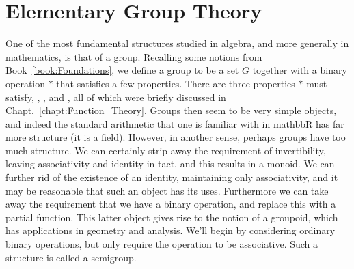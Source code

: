 \begingroup
    \ifcsname\PATH\endcsname
        \newcommand{\PATH}{books/Algebra/Group_Theory}
        \newcommand{\OLDPATH}{\PATH}
    \else
        \newcommand{\OLDPATH}{\PATH}
        \renewcommand{\PATH}{books/Algebra/Group_Theory}
    \fi
    \chapter{Elementary Group Theory}
        One of the most fundamental structures studied in algebra, and more
        generally in mathematics, is that of a \gls{group}.
        Recalling some notions from Book~\ref{book:Foundations}, we define a
        group to be a \gls{set} $G$ together with a
        \gls{binary operation} $*$ that satisfies a few
        properties. There are three properties $*$ must satisfy,
        ,
        , and
        ,
        all of which were briefly discussed in
        Chapt.~\ref{chapt:Function_Theory}. Groups then seem to be very simple
        objects, and indeed the standard arithmetic that one is
        familiar with in \gls{mathbbR} has far more structure (it is a
        \gls{field}). However, in another sense, perhaps groups
        have too much structure. We can certainly strip away the requirement of
        invertibility, leaving associativity and identity in tact, and this
        results in a \gls{monoid}. We can further rid of the
        existence of an identity, maintaining only associativity, and it may be
        reasonable that such an object has its uses. Furthermore we can take
        away the requirement that we have a binary operation, and replace this
        with a partial function. This latter object
        gives rise to the notion of a groupoid, which has
        applications in geometry and analysis. We'll begin by considering
        ordinary binary operations, but only require the operation to be
        associative. Such a structure is called a
        \gls{semigroup}.
        
        
        
